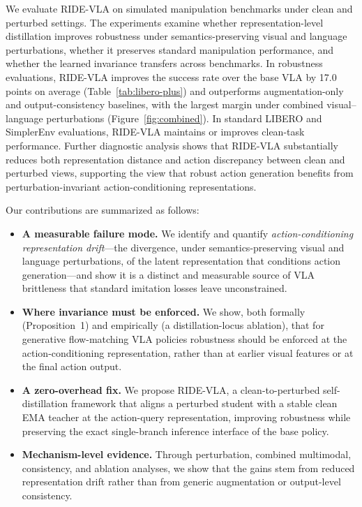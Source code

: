 \documentclass[letterpaper]{article} %
\newcommand{\method}{\textsc{RIDE-VLA}}
\newcommand{\gainBase}{17.0}   %
\begin{document}
We evaluate \method{} on simulated manipulation benchmarks under clean and perturbed settings. The experiments examine whether representation-level distillation improves robustness under semantics-preserving visual and language perturbations, whether it preserves standard manipulation performance, and whether the learned invariance transfers across benchmarks. In robustness evaluations, \method{} improves the success rate over the base VLA by \gainBase{} points on average (Table~\ref{tab:libero-plus}) and outperforms augmentation-only and output-consistency baselines, with the largest margin under combined visual--language perturbations (Figure~\ref{fig:combined}). In standard LIBERO and SimplerEnv evaluations, \method{} maintains or improves clean-task performance. Further diagnostic analysis shows that \method{} substantially reduces both representation distance and action discrepancy between clean and perturbed views, supporting the view that robust action generation benefits from perturbation-invariant action-conditioning representations.

Our contributions are summarized as follows:
\begin{itemize}
\item \textbf{A measurable failure mode.} We identify and quantify \emph{action-conditioning representation drift}---the divergence, under semantics-preserving visual and language perturbations, of the latent representation that conditions action generation---and show it is a distinct and measurable source of VLA brittleness that standard imitation losses leave unconstrained.
\item \textbf{Where invariance must be enforced.} We show, both formally (Proposition~1) and empirically (a distillation-locus ablation), that for generative flow-matching VLA policies robustness should be enforced at the action-conditioning representation, rather than at earlier visual features or at the final action output.
\item \textbf{A zero-overhead fix.} We propose \method{}, a clean-to-perturbed self-distillation framework that aligns a perturbed student with a stable clean EMA teacher at the action-query representation, improving robustness while preserving the exact single-branch inference interface of the base policy.
\item \textbf{Mechanism-level evidence.} Through perturbation, combined multimodal, consistency, and ablation analyses, we show that the gains stem from reduced representation drift rather than from generic augmentation or output-level consistency.
\end{itemize}
\end{document}
